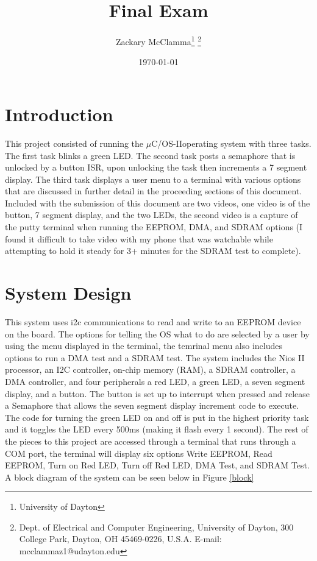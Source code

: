 \documentclass[10pt,a4paper]{article}
\begin{document}
	\title{Final Exam}
	\makeatletter
	
	\author{Zackary McClamma\thanks{University of Dayton}
		\thanks{Dept. of Electrical and Computer
			Engineering, University of Dayton, 300 College Park, Dayton, OH
			45469-0226, U.S.A. E-mail:
			mcclammaz1@udayton.edu}}
	
	\makeatother
	
	\date{\today}
	
	\maketitle
	\section{Introduction}
	This project consisted of running the $\mu$C/OS-II\texttrademark operating system with three tasks. The first task blinks a green LED. The second task posts a semaphore that is unlocked by a button ISR, upon unlocking the task then increments a 7 segment display. The third task displays a user menu to a terminal with various options that are discussed in further detail in the proceeding sections of this document. Included with the submission of this document are two videos, one video is of the button, 7 segment display, and the two LEDs, the second video is a capture of the putty terminal when running the EEPROM, DMA, and SDRAM options (I found it difficult to take video with my phone that was watchable while attempting to hold it steady for 3+ minutes for the SDRAM test to complete).
	
	\section{System Design}
	This system uses i2c communications to read and write to an EEPROM device on the board. The options for telling the OS what to do are selected by a user by using the menu displayed in the terminal, the temrinal menu also includes options to run a DMA test and a SDRAM test. The system includes the Nios II processor, an I2C controller, on-chip memory (RAM), a SDRAM controller, a DMA controller, and four peripherals a red LED, a green LED, a seven segment display, and a button. The button is set up to interrupt when pressed and release a Semaphore that allows the seven segment display increment code to execute. The code for turning the green LED on and off is put in the highest priority task and it toggles the LED every 500ms (making it flash every 1 second). The rest of the pieces to this project are accessed through a terminal that runs through a COM port, the terminal will display six options Write EEPROM, Read EEPROM, Turn on Red LED, Turn off Red LED, DMA Test, and SDRAM Test. A block diagram of the system can be seen below in Figure \ref{block}
\end{document}
